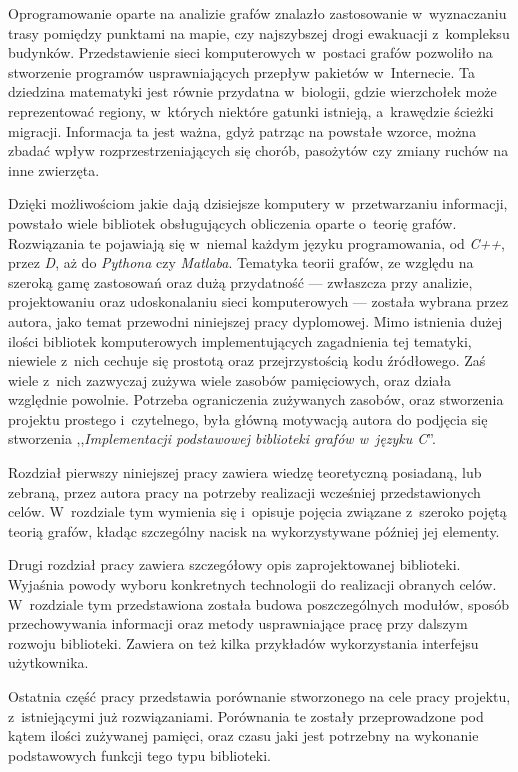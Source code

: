 \documentclass[a4paper,12pt,polish,twoside,openright]{thesis}
\begin{document}
Oprogramowanie oparte na analizie grafów znalazło zastosowanie w~wyznaczaniu trasy pomiędzy punktami na mapie, czy najszybszej drogi ewakuacji z~kompleksu budynków.
Przedstawienie sieci komputerowych w~postaci grafów pozwoliło na stworzenie programów usprawniających przepływ pakietów w~Internecie.
Ta dziedzina matematyki jest równie przydatna w~biologii, gdzie wierzchołek może reprezentować regiony, w~których niektóre gatunki istnieją, a~krawędzie ścieżki migracji. Informacja ta jest ważna, gdyż patrząc na powstałe wzorce, można zbadać wpływ rozprzestrzeniających się chorób, pasożytów czy zmiany ruchów na inne zwierzęta.

Dzięki możliwościom jakie dają dzisiejsze komputery w~przetwarzaniu informacji, powstało wiele bibliotek obsługujących obliczenia oparte o~teorię grafów.
Rozwiązania te pojawiają się w~niemal każdym języku programowania, od \emph{C++}, przez \emph{D}, aż do \emph{Pythona} czy \emph{Matlaba}.
Tematyka teorii grafów, ze względu na szeroką gamę zastosowań oraz dużą przydatność --- zwłaszcza przy analizie, projektowaniu oraz udoskonalaniu sieci komputerowych --- została wybrana przez autora, jako temat przewodni niniejszej pracy dyplomowej.
Mimo istnienia dużej ilości bibliotek komputerowych implementujących zagadnienia tej tematyki, niewiele z~nich cechuje się prostotą oraz przejrzystością kodu źródłowego.
Zaś wiele z~nich zazwyczaj zużywa wiele zasobów pamięciowych, oraz działa względnie powolnie.
Potrzeba ograniczenia zużywanych zasobów, oraz stworzenia projektu prostego i~czytelnego, była główną motywacją autora do podjęcia się stworzenia ,,\emph{Implementacji podstawowej biblioteki grafów w~języku C}''.

Rozdział pierwszy niniejszej pracy zawiera wiedzę teoretyczną posiadaną, lub zebraną, przez autora pracy na potrzeby realizacji wcześniej przedstawionych celów.
W~rozdziale tym wymienia się i~opisuje pojęcia związane z~szeroko pojętą teorią grafów, kładąc szczególny nacisk na wykorzystywane później jej elementy.

Drugi rozdział pracy zawiera szczegółowy opis zaprojektowanej biblioteki.
Wyjaśnia powody wyboru konkretnych technologii do realizacji obranych celów.
W~rozdziale tym przedstawiona została budowa poszczególnych modułów, sposób przechowywania informacji oraz metody usprawniające pracę przy dalszym rozwoju biblioteki.
Zawiera on też kilka przykładów wykorzystania interfejsu użytkownika.

Ostatnia część pracy przedstawia porównanie stworzonego na cele pracy projektu, z~istniejącymi już rozwiązaniami.
Porównania te zostały przeprowadzone pod kątem ilości zużywanej pamięci, oraz czasu jaki jest potrzebny na wykonanie podstawowych funkcji tego typu biblioteki.
\end{document}
